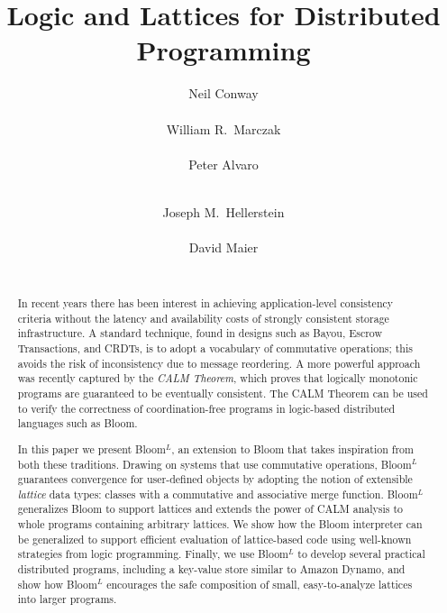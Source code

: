 \documentclass{sig-alternate}
\def\lang{Bloom$^L$\xspace}
\begin{document}
\title{Logic and Lattices for Distributed Programming}


\author{
\alignauthor
Neil Conway\\
       \\
\alignauthor
William R.\ Marczak\\
       \\
\alignauthor
Peter Alvaro\\
       \\
\and
\alignauthor
Joseph M.\ Hellerstein\\
       \\
\alignauthor
David Maier\\
       \\
}

\maketitle

\begin{abstract}
  In recent years there has been interest in achieving application-level
  consistency criteria without the latency and availability costs of strongly
  consistent storage infrastructure. A standard technique, found in designs such
  as Bayou, Escrow Transactions, and CRDTs, is to adopt a vocabulary of
  commutative operations; this avoids the risk of inconsistency due to message
  reordering.  A more powerful approach was recently captured by the \emph{CALM
    Theorem}, which proves that logically monotonic programs are guaranteed to
  be eventually consistent. The CALM Theorem can be used to verify the
  correctness of coordination-free programs in logic-based distributed languages
  such as Bloom.

  In this paper we present \lang, an extension to Bloom that takes inspiration
  from both these traditions.  Drawing on systems that use commutative
  operations, \lang guarantees convergence for user-defined objects by adopting
  the notion of extensible \emph{lattice} data types: classes with a commutative
  and associative merge function.  \lang generalizes Bloom to support lattices
  and extends the power of CALM analysis to whole programs containing arbitrary
  lattices. We show how the Bloom interpreter can be generalized to support
  efficient evaluation of lattice-based code using well-known strategies from
  logic programming.  Finally, we use \lang to develop several practical
  distributed programs, including a key-value store similar to Amazon Dynamo,
  and show how \lang encourages the safe composition of small, easy-to-analyze
  lattices into larger programs.
\end{abstract}
\end{document}

